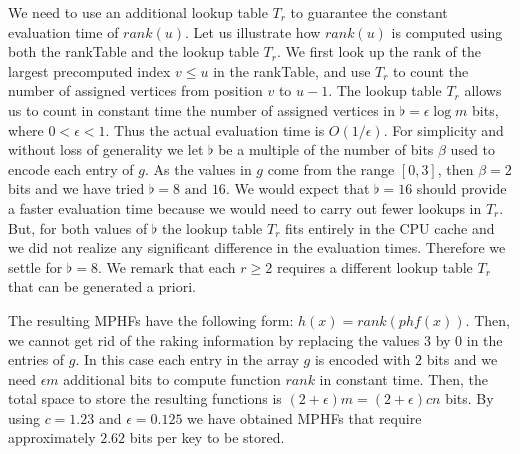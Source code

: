 We need to use an additional lookup table $T_r$
to guarantee the constant evaluation time of $\mathit{rank}(u)$.
Let us illustrate how $\mathit{rank}(u)$ is computed
using both the rankTable and the lookup table $T_r$.
We first look up 
the rank of the largest precomputed index
$v\leq u$ in the rankTable, 
and use $T_r$ to count the number of assigned vertices from position
$v$ to $u-1$.
The lookup table $T_r$ allows us to count in constant time
the number of assigned vertices in $\flat=\epsilon \log m$ bits,
where $0 < \epsilon  < 1$. Thus the actual evaluation time is $O(1/\epsilon)$.
For simplicity and
without loss of generality we let $\flat$ be a multiple of the number of
bits $\beta$ used to encode each entry of $g$.
As the values in $g$ come from the range $[0,3]$,
then $\beta=2$ bits and we have tried $\flat = 8 \text{ and } 16$.
We would expect that $\flat = 16$ should provide 
a faster evaluation time because we would need to carry out fewer lookups
in $T_r$. But, for both values of $\flat$ the lookup table $T_r$ fits entirely in 
the CPU cache and we did not realize any significant difference in 
the evaluation times. Therefore we settle for $\flat=8$.
We remark that each $r \ge 2$ requires 
a different lookup table $T_r$ that can be generated a priori.








The resulting 
MPHFs have the following form:
$h(x) = \mathit{rank}(\mathit{phf}(x))$.
Then, we cannot get rid of
the raking information by replacing the values 3 by 0 in the entries of $g$.
In this case each entry in the array $g$ is encoded 
with $2$ bits and we need $\epsilon m$ additional bits to compute function
$\mathit{rank}$ in constant time. Then, the total space to store 
the resulting functions is $(2 + \epsilon)m = (2 + \epsilon)cn$ bits.
By using $c = 1.23$ and $\epsilon = 0.125$
we have obtained MPHFs that require approximately $2.62$ bits per key to be stored.


